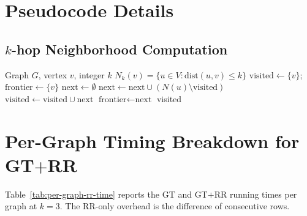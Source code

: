 \documentclass[11pt,a4paper]{article}
\begin{document}
\appendix

\section{Pseudocode Details}

\subsection{$k$-hop Neighborhood Computation}

\begin{algorithm}[ht]
\caption{$N_k(G,v,k)$ — BFS $k$ hops}
\label{alg:nk}
\begin{algorithmic}[1]
\Require Graph $G$, vertex $v$, integer $k$
\Ensure $N_k(v)=\{u\in V:\mathrm{dist}(u,v)\le k\}$
\State $\text{visited}\gets\{v\}$;\; $\text{frontier}\gets\{v\}$
  \State $\text{next}\gets\emptyset$
    \State $\text{next}\gets\text{next}\cup(N(u)\setminus\text{visited})$
  \EndFor
  \State $\text{visited}\gets\text{visited}\cup\text{next}$
  \State $\text{frontier}\gets\text{next}$
\EndFor
\State \Return visited
\end{algorithmic}
\end{algorithm}


\section{Per-Graph Timing Breakdown for GT$+$RR}
\label{app:per-graph-time}

Table~\ref{tab:per-graph-rr-time} reports the GT and GT$+$RR running
times per graph at $k=3$. The RR-only overhead is the difference of
consecutive rows.
\end{document}
